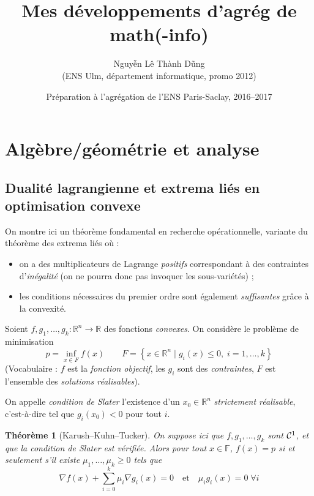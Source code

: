 \documentclass[a4paper, 11pt]{article}
\def\F{\mathbb{F}}
\def\R{\mathbb{R}}
\def\Cf{{\cal{C}}}
\newtheorem*{theorem}{Théorème}
\begin{document}
\title{Mes développements d'agrég de math(-info)}
\author{Nguyễn Lê Thành Dũng\\(ENS Ulm, département informatique, promo 2012)}
\date{Préparation à l'agrégation de l'ENS Paris-Saclay, 2016--2017}
\maketitle

\tableofcontents

\newpage

\section{Algèbre/géométrie et analyse}

\subsection{Dualité lagrangienne et extrema liés en optimisation convexe}

On montre ici un théorème fondamental en recherche opérationnelle, variante du
théorème des extrema liés où :
\begin{itemize}
\item on a des multiplicateurs de Lagrange \emph{positifs} correspondant à des
  contraintes d'\emph{inégalité} (on ne pourra donc pas invoquer les
  sous-variétés) ;
\item les conditions nécessaires du premier ordre sont également
  \emph{suffisantes} grâce à la convexité.
\end{itemize}
Soient $f,g_1,\ldots,g_k : \R^n \to \R$ des fonctions \emph{convexes}.
On considère le problème de minimisation
\[ p = \inf_{x \in F} f(x) \qquad F = \left\{ x \in \R^n \mid
  g_i(x) \leq 0,\; i = 1,\ldots,k \right\} \]
(Vocabulaire : $f$ est la \emph{fonction objectif}, les $g_i$ sont des
\emph{contraintes}, $F$ est l'ensemble des \emph{solutions réalisables}).

On appelle \emph{condition de Slater} l'existence d'un $x_0 \in \R^n$
\emph{strictement réalisable}, c'est-à-dire tel que $g_i(x_0) < 0$ pour tout
$i$.

\begin{theorem}[Karush--Kuhn--Tucker]
  On suppose ici que $f, g_1, \ldots, g_k$ sont $\Cf^1$, et que la condition de
  Slater est vérifiée. Alors pour tout $x \in \F$, $f(x) = p$ si et seulement
  s'il existe $\mu_1, \ldots, \mu_k \geq 0$ tels que
  \[ \nabla f(x) + \sum_{i=0}^k \mu_i \nabla g_i(x) = 0 \quad \text{et} \quad
    \mu_i g_i(x) = 0\; \forall i
  \]
\end{theorem}
\end{document}
